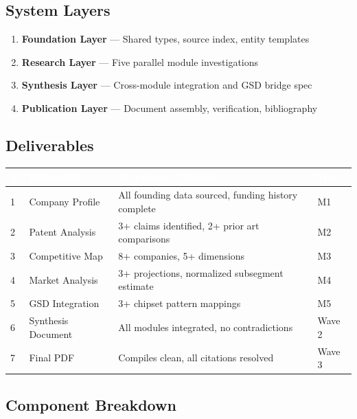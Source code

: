 \documentclass[11pt,letterpaper]{article}
\newcommand{\tableheader}[1]{\textbf{\sffamily\textcolor{white}{#1}}}
\begin{document}
\subsection{System Layers}

\begin{enumerate}[leftmargin=2em]
  \item \textbf{Foundation Layer} --- Shared types, source index, entity templates
  \item \textbf{Research Layer} --- Five parallel module investigations
  \item \textbf{Synthesis Layer} --- Cross-module integration and GSD bridge spec
  \item \textbf{Publication Layer} --- Document assembly, verification, bibliography
\end{enumerate}

\subsection{Deliverables}

\begin{center}
\begin{tabularx}{\textwidth}{C{0.5cm}L{3.5cm}XL{2.5cm}}
\toprule
{}
\tableheader{\#} & \tableheader{Deliverable} & \tableheader{Acceptance Criteria} & \tableheader{Spec} \\
 & Company Profile & All founding data sourced, funding history complete & M1 \\
2 & Patent Analysis & 3+ claims identified, 2+ prior art comparisons & M2 \\
3 & Competitive Map & 8+ companies, 5+ dimensions & M3 \\
4 & Market Analysis & 3+ projections, normalized subsegment estimate & M4 \\
5 & GSD Integration & 3+ chipset pattern mappings & M5 \\
6 & Synthesis Document & All modules integrated, no contradictions & Wave 2 \\
7 & Final PDF & Compiles clean, all citations resolved & Wave 3 \\
\bottomrule
\end{tabularx}
\end{center}

\subsection{Component Breakdown}
\end{document}
